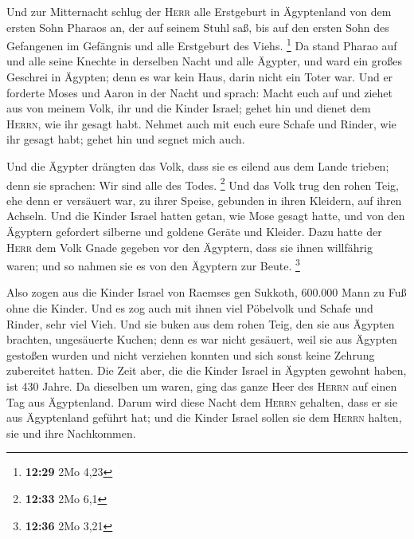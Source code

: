  Und zur Mitternacht schlug der \textsc{Herr} alle
Erstgeburt in Ägyptenland von dem ersten Sohn Pharaos an, der auf seinem
Stuhl saß, bis auf den ersten Sohn des Gefangenen im Gefängnis und alle
Erstgeburt des Viehs. \footnote{\textbf{12:29} 2Mo 4,23} 
Da stand Pharao auf und alle seine Knechte in derselben Nacht und alle
Ägypter, und ward ein großes Geschrei in Ägypten; denn es war kein Haus,
darin nicht ein Toter war.  Und er forderte Moses und
Aaron in der Nacht und sprach: Macht euch auf und ziehet aus von meinem
Volk, ihr und die Kinder Israel; gehet hin und dienet dem
\textsc{Herrn}, wie ihr gesagt habt.  Nehmet auch mit
euch eure Schafe und Rinder, wie ihr gesagt habt; gehet hin und segnet
mich auch.

 Und die Ägypter drängten das Volk, dass sie es eilend
aus dem Lande trieben; denn sie sprachen: Wir sind alle des Todes.
\footnote{\textbf{12:33} 2Mo 6,1}  Und das Volk trug den
rohen Teig, ehe denn er versäuert war, zu ihrer Speise, gebunden in
ihren Kleidern, auf ihren Achseln.  Und die Kinder Israel
hatten getan, wie Mose gesagt hatte, und von den Ägyptern gefordert
silberne und goldene Geräte und Kleider.  Dazu hatte der
\textsc{Herr} dem Volk Gnade gegeben vor den Ägyptern, dass sie ihnen
willfährig waren; und so nahmen sie es von den Ägyptern zur Beute.
\footnote{\textbf{12:36} 2Mo 3,21}

 Also zogen aus die Kinder Israel von Raemses gen
Sukkoth, 600.000 Mann zu Fuß ohne die Kinder.  Und es zog
auch mit ihnen viel Pöbelvolk und Schafe und Rinder, sehr viel Vieh.
 Und sie buken aus dem rohen Teig, den sie aus Ägypten
brachten, ungesäuerte Kuchen; denn es war nicht gesäuert, weil sie aus
Ägypten gestoßen wurden und nicht verziehen konnten und sich sonst keine
Zehrung zubereitet hatten.  Die Zeit aber, die die Kinder
Israel in Ägypten gewohnt haben, ist 430 Jahre.  Da
dieselben um waren, ging das ganze Heer des \textsc{Herrn} auf einen Tag
aus Ägyptenland.  Darum wird diese Nacht dem
\textsc{Herrn} gehalten, dass er sie aus Ägyptenland geführt hat; und
die Kinder Israel sollen sie dem \textsc{Herrn} halten, sie und ihre
Nachkommen.

